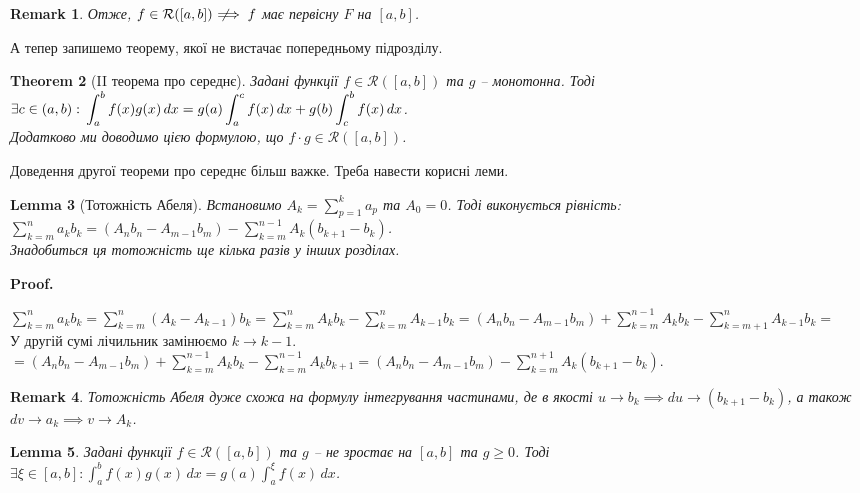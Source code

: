 \documentclass[a4paper, 10pt]{article}
\makeatletter
\def\huge{\displaystyle}
\theoremstyle{theoremdd}
\newtheorem{theorem}{Theorem}[subsection]
\theoremstyle{theoremdd}
\theoremstyle{theoremdd}
\theoremstyle{theoremdd}
\theoremstyle{theoremdd}
\theoremstyle{theoremdd}
\theoremstyle{theoremdd}
\newtheorem{remark}[theorem]{Remark}
\theoremstyle{theoremdd}
\newtheorem{lemma}[theorem]{Lemma}
\theoremstyle{theoremdd}
\renewenvironment{proof}[1][Proof.\\]{\par
\pushQED{\hfill \qed}%
\normalfont \topsep6\p@\@plus6\p@\relax
\trivlist
\item\relax
{\bfseries
#1\@addpunct{.}}\hspace\labelsep\ignorespaces
}{%
\popQED\endtrivlist\@endpefalse
}
\newcommand{\notimplies}{\;\not\!\!\!\implies}
\makeatother
\begin{document}
\begin{remark}
Отже, $f \in \mathcal{R}([a,b]) \notimplies f$ має первісну $F$ на $[a,b]$.
\end{remark}

А тепер запишемо теорему, якої не вистачає попередньому підрозділу.
\begin{theorem}[II теорема про середнє]
Задані функції $f\in \mathcal{R}([a,b])$ та $g$ -- монотонна. Тоді $\exists c \in (a,b): \\ \huge\int_a^b f(x)g(x)\,dx = g(a)\int_a^c f(x)\,dx + g(b) \int_c^b f(x)\,dx$.\\
Додатково ми доводимо цією формулою, що $f \cdot g \in \mathcal{R}([a,b])$.
\end{theorem}

Доведення другої теореми про середнє більш важке. Треба навести корисні леми.
\begin{lemma}[Тотожність Абеля]
Встановимо $A_k = \huge\sum_{p=1}^k a_p$ та $A_0 = 0$. Тоді виконується рівність:\\
$\huge\sum_{k=m}^n a_k b_k = \left(A_n b_n - A_{m-1} b_m \right) - \huge\sum_{k=m}^{n-1} A_k(b_{k+1}-b_{k})$.\\
\textit{Знадобиться ця тотожність ще кілька разів у інших розділах.}
\end{lemma}

\begin{proof}
$\huge\sum_{k=m}^n a_k b_k = \sum_{k=m}^n (A_k-A_{k-1})b_k = \sum_{k=m}^n A_k b_k - \sum_{k=m}^n A_{k-1}b_k = (A_nb_n - A_{m-1}b_m) + \sum_{k=m}^{n-1} A_k b_k - \sum_{k=m+1}^n A_{k-1}b_k \boxed{=}$\\
У другій сумі лічильник замінюємо $k \to k-1$.\\
$\boxed{=} \huge (A_nb_n - A_{m-1}b_m) + \sum_{k=m}^{n-1} A_k b_k - \sum_{k=m}^{n-1} A_{k}b_{k+1} = (A_nb_n - A_{m-1}b_m) - \sum_{k=m}^{n+1} A_k (b_{k+1}-b_k)$.
\end{proof}

\begin{remark}
Тотожність Абеля дуже схожа на формулу інтегрування частинами, де в якості $u \to b_k \implies du \to (b_{k+1}-b_k)$, а також $dv \to a_k \implies v \to A_k$.
\end{remark}

\begin{lemma}
Задані функції $f \in \mathcal{R}([a,b])$ та $g$ -- не зростає на $[a,b]$ та $g \geq 0$.  Тоді $\exists \xi \in [a,b]: \huge\int_a^b f(x)g(x)\,dx = g(a) \int_a^\xi f(x)\,dx$.
\end{lemma}
\end{document}
